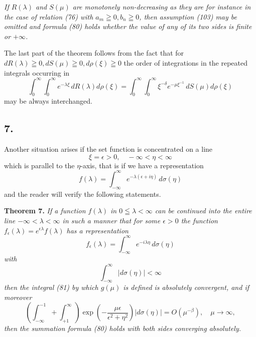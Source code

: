 \documentclass[12pt]{article}
\begin{document}
\emph{If \(R(\lambda)\) and \(S(\mu)\) are monotonely non-decreasing as they are for instance in the case of relation (76) with \(a_m \geqq 0, b_n \geqq 0\), then assumption (103) may be omitted and formula (80) holds whether the value of any of its two sides is finite or \(+\infty\).}

The last part of the theorem follows from the fact that for \(dR(\lambda) \geqq 0, dS(\mu) \geqq 0, d\rho(\xi) \geqq 0\) the order of integrations in the repeated integrals occurring in
\begin{equation}
\int_0^{\infty} \int_0^{\infty} e^{-\lambda\xi} \, dR(\lambda) d\rho(\xi) = \int_0^{\infty} \int_0^{\infty} \xi^{-\delta} e^{-\mu\xi^{-1}} \, dS(\mu) d\rho(\xi)
\tag{104}
\end{equation}
may be always interchanged.

\subsection*{7.}

Another situation arises if the set function is concentrated on a line
\begin{equation}
\xi = \epsilon > 0, \quad -\infty < \eta < \infty
\tag{105}
\end{equation}
which is parallel to the \(\eta\)-axis, that is if we have a representation
\begin{equation}
f(\lambda) = \int_{-\infty}^{\infty} e^{-\lambda(\epsilon+i\eta)} \, d\sigma(\eta)
\tag{106}
\end{equation}
and the reader will verify the following statements.

\medskip

\noindent\textbf{Theorem 7.} \emph{If a function \(f(\lambda)\) in \(0 \leqq \lambda < \infty\) can be continued into the entire line \(-\infty < \lambda < \infty\) in such a manner that for some \(\epsilon > 0\) the function \(f_\epsilon(\lambda) = e^{\epsilon\lambda} f(\lambda)\) has a representation}
\begin{equation}
f_\epsilon(\lambda) = \int_{-\infty}^{\infty} e^{-i\lambda\eta} \, d\sigma(\eta)
\tag{107}
\end{equation}
\emph{with}
\begin{equation}
\int_{-\infty}^{\infty} | d\sigma(\eta) | < \infty
\tag{108}
\end{equation}
\emph{then the integral (81) by which \(g(\mu)\) is defined is absolutely convergent, and if moreover}
\begin{equation}
\left( \int_{-\infty}^{-1} + \int_{+1}^{\infty} \right) \exp \left( -\frac{\mu\epsilon}{\epsilon^2 + \eta^2} \right) | d\sigma(\eta) | = O(\mu^{-\beta}), \quad \mu \to \infty,
\tag{109}
\end{equation}
\emph{then the summation formula (80) holds with both sides converging absolutely.}
\end{document}
